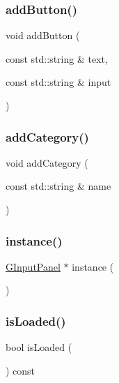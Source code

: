 \subsubsection{\texorpdfstring{add\+Button()}{addButton()}}
{\footnotesize\ttfamily void add\+Button (\begin{DoxyParamCaption}\item[{const std\+::string \&}]{text,  }\item[{const std\+::string \&}]{input }\end{DoxyParamCaption})}

\mbox{\label{classGInputPanel_a6374a32799da00678a7f8856d54240f9}} 
\subsubsection{\texorpdfstring{add\+Category()}{addCategory()}}
{\footnotesize\ttfamily void add\+Category (\begin{DoxyParamCaption}\item[{const std\+::string \&}]{name }\end{DoxyParamCaption})}

\mbox{\label{classGInputPanel_aaac6dfbe52b6dad727a856bcc72c1553}} 
\subsubsection{\texorpdfstring{instance()}{instance()}}
{\footnotesize\ttfamily \mbox{\hyperlink{classGInputPanel}{G\+Input\+Panel}} $\ast$ instance (\begin{DoxyParamCaption}{ }\end{DoxyParamCaption})\hspace{0.3cm}{\ttfamily [static]}}

\mbox{\label{classGInputPanel_af4529478109e5691162fef4acf9bf0c5}} 
\subsubsection{\texorpdfstring{is\+Loaded()}{isLoaded()}}
{\footnotesize\ttfamily bool is\+Loaded (\begin{DoxyParamCaption}{ }\end{DoxyParamCaption}) const}

